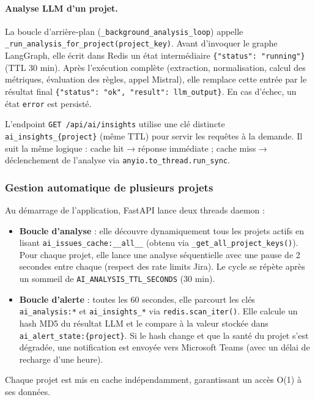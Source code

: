 \paragraph{Analyse LLM d’un projet.}
La boucle d’arrière‑plan (\texttt{\_background\_analysis\_loop}) appelle \texttt{\_run\_analysis\_for\_project(project\_key)}. Avant d’invoquer le graphe LangGraph, elle écrit dans Redis un état intermédiaire \texttt{\{"status": "running"\}} (TTL 30 min). Après l’exécution complète (extraction, normalisation, calcul des métriques, évaluation des règles, appel Mistral), elle remplace cette entrée par le résultat final \texttt{\{"status": "ok", "result": llm\_output\}}. En cas d’échec, un état \texttt{error} est persisté.

L’endpoint \texttt{GET /api/ai/insights} utilise une clé distincte \texttt{ai\_insights\_\{project\}} (même TTL) pour servir les requêtes à la demande. Il suit la même logique : cache hit → réponse immédiate ; cache miss → déclenchement de l’analyse via \texttt{anyio.to\_thread.run\_sync}.

\subsubsection*{Gestion automatique de plusieurs projets}

Au démarrage de l’application, FastAPI lance deux threads daemon :

\begin{itemize}
    \item \textbf{Boucle d’analyse} : elle découvre dynamiquement tous les projets actifs en lisant \texttt{ai\_issues\_cache:\_\_all\_\_} (obtenu via \texttt{\_get\_all\_project\_keys()}). Pour chaque projet, elle lance une analyse séquentielle avec une pause de 2 secondes entre chaque (respect des rate limits Jira). Le cycle se répète après un sommeil de \texttt{AI\_ANALYSIS\_TTL\_SECONDS} (30 min).
    \item \textbf{Boucle d’alerte} : toutes les 60 secondes, elle parcourt les clés \texttt{ai\_analysis:*} et \texttt{ai\_insights\_*} via \texttt{redis.scan\_iter()}. Elle calcule un hash MD5 du résultat LLM et le compare à la valeur stockée dans \texttt{ai\_alert\_state:\{project\}}. Si le hash change et que la santé du projet s’est dégradée, une notification est envoyée vers Microsoft Teams (avec un délai de recharge d’une heure).
\end{itemize}

Chaque projet est mis en cache indépendamment, garantissant un accès O(1) à ses données.

